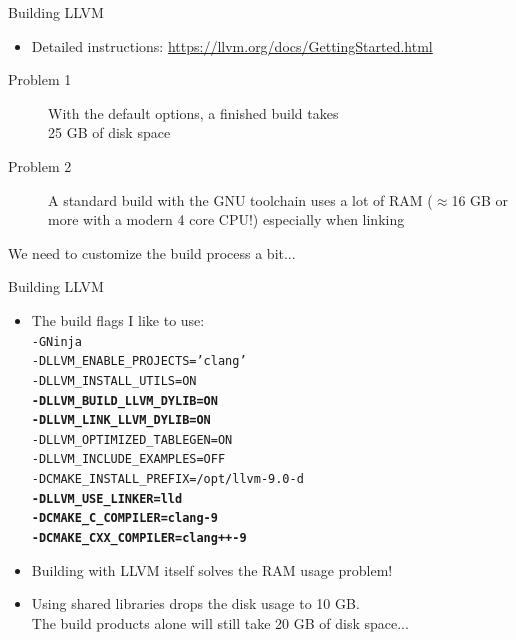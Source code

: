 \begin{frame}{Building LLVM}
\begin{itemize}
\item Detailed instructions: \url{https://llvm.org/docs/GettingStarted.html}
\end{itemize}
\bigskip
\begin{description}
\item[Problem 1] With the \alert{default options}, a finished build takes\\\alert{25 GB of disk space}
\item[Problem 2] A standard build with the GNU toolchain uses \alert{a lot of RAM} ($\approx$16 GB or more with a modern 4 core CPU!) especially when linking
\end{description}
\bigskip
We need to customize the build process a bit...
\end{frame}


\begin{frame}{Building LLVM}
\begin{itemize}
\item The build flags I like to use:\\
\smallskip\texttt{\small-GNinja \\
-DLLVM\_ENABLE\_PROJECTS='clang' \\
-DLLVM\_INSTALL\_UTILS=ON \\
\textbf{-DLLVM\_BUILD\_LLVM\_DYLIB=ON \\
-DLLVM\_LINK\_LLVM\_DYLIB=ON} \\
-DLLVM\_OPTIMIZED\_TABLEGEN=ON \\
-DLLVM\_INCLUDE\_EXAMPLES=OFF \\
-DCMAKE\_INSTALL\_PREFIX=/opt/llvm-9.0-d \\
\textbf{-DLLVM\_USE\_LINKER=lld \\
-DCMAKE\_C\_COMPILER=clang-9 \\
-DCMAKE\_CXX\_COMPILER=clang++-9} \\
}
\item Building with LLVM itself solves the RAM usage problem!
\item Using \alert{shared libraries} drops the disk usage to \alert{10 GB}.\\
{\footnotesize The build products alone will still take 20 GB of disk space...}
\end{itemize}
\end{frame}


